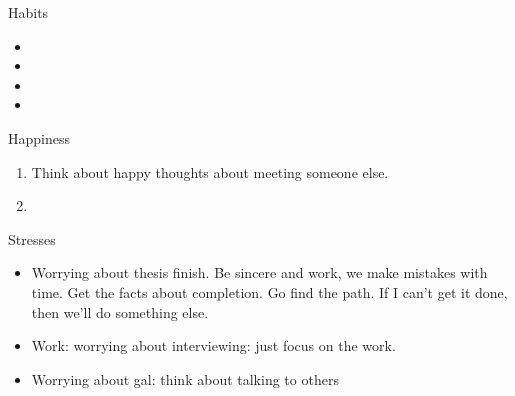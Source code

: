 \documentclass[serif, mathserif, final]{beamer}
\begin{document}
\begin{frame}{} 
  \begin{columns}
    \begin{column}{0.25\linewidth} %
      \begin{block}{Habits}
        \begin{itemize}
          \tiny \item \tiny 
        \item \tiny 
        \item \tiny 
        \item \tiny 
        \end{itemize}
      \end{block}

      \begin{block}{Happiness}  
        \begin{enumerate}
        \tiny \item \tiny Think about happy thoughts about meeting
        someone else.  
      \item \tiny 
        \end{enumerate}
      \end{block} 

      \begin{block}{Stresses}
        \begin{itemize}
          \tiny \item \tiny Worrying about thesis finish. Be sincere
          and work, we make mistakes with time. Get the facts about
          completion. Go find the path. If I can't get it done, then we'll do
          something else. 
          \item \tiny Work: worrying about interviewing: just
            focus on the work. 
          \item \tiny Worrying about gal: think about talking to
            others 

        \end{itemize} 
      \end{block} 
      

\end{column}
\end{columns}
\end{frame}
\end{document}

